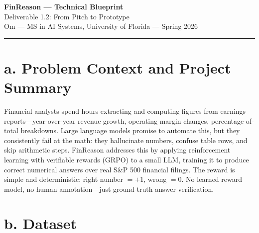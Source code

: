 \documentclass[10pt]{article}
\begin{document}
\begin{center}
    {\Large \textbf{FinReason --- Technical Blueprint}} \\[4pt]
    {\normalsize Deliverable 1.2: From Pitch to Prototype} \\[3pt]
    {\small Om --- MS in AI Systems, University of Florida --- Spring 2026}
\end{center}
\vspace{2pt}\hrule\vspace{6pt}

\section{a. Problem Context and Project Summary}

Financial analysts spend hours extracting and computing figures from earnings reports---year-over-year revenue growth, operating margin changes, percentage-of-total breakdowns. Large language models promise to automate this, but they consistently fail at the math: they hallucinate numbers, confuse table rows, and skip arithmetic steps. FinReason addresses this by applying reinforcement learning with verifiable rewards (GRPO) to a small LLM, training it to produce correct numerical answers over real S\&P 500 financial filings. The reward is simple and deterministic: right number $= +1$, wrong $= 0$. No learned reward model, no human annotation---just ground-truth answer verification.

\section{b. Dataset}
\end{document}
